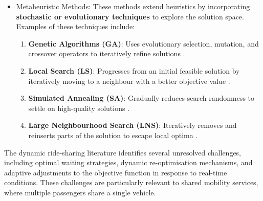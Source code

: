 \begin{itemize}
    \item Metaheuristic Methods: These methods extend heuristics by incorporating\textbf{ stochastic or evolutionary techniques} to explore the solution space. Examples of these techniques include:
    \begin{enumerate}
        \item \textbf{Genetic Algorithms (GA)}: Uses evolutionary selection, mutation, and crossover operators to iteratively refine solutions \cite{herbawi2012genetic81}.
        \item \textbf{Local Search (LS)}: Progresses from an initial feasible solution by iteratively moving to a neighbour with a better objective value \cite{Crama1995}.  
        \item \textbf{Simulated Annealing (SA)}: Gradually reduces search randomness to settle on high-quality solutions \cite{ameli2019heuristic16}.
        \item \textbf{Large Neighbourhood Search (LNS)}: Iteratively removes and reinserts parts of the solution to escape local optima \cite{braekers2016multi35}.
    \end{enumerate}
\end{itemize}


The dynamic ride-sharing literature identifies several unresolved challenges, including optimal waiting strategies, dynamic re-optimisation mechanisms, and adaptive adjustments to the objective function in response to real-time conditions. These challenges are particularly relevant to shared mobility services, where multiple passengers share a single vehicle.

